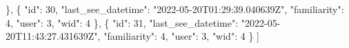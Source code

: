 \documentclass[
]{article}
\newenvironment{Shaded}{}{}
\newcommand{\DataTypeTok}[1]{\textcolor[rgb]{0.56,0.13,0.00}{#1}}
\newcommand{\DecValTok}[1]{\textcolor[rgb]{0.25,0.63,0.44}{#1}}
\newcommand{\FunctionTok}[1]{\textcolor[rgb]{0.02,0.16,0.49}{#1}}
\newcommand{\OtherTok}[1]{\textcolor[rgb]{0.00,0.44,0.13}{#1}}
\newcommand{\StringTok}[1]{\textcolor[rgb]{0.25,0.44,0.63}{#1}}
\begin{document}
\begin{Shaded}
\begin{Highlighting}[]
  \FunctionTok{\}}\OtherTok{,}
  \FunctionTok{\{}
    \DataTypeTok{"id"}\FunctionTok{:} \DecValTok{30}\FunctionTok{,}
    \DataTypeTok{"last\_see\_datetime"}\FunctionTok{:} \StringTok{"2022{-}05{-}20T01:29:39.040639Z"}\FunctionTok{,}
    \DataTypeTok{"familiarity"}\FunctionTok{:} \DecValTok{4}\FunctionTok{,}
    \DataTypeTok{"user"}\FunctionTok{:} \DecValTok{3}\FunctionTok{,}
    \DataTypeTok{"wid"}\FunctionTok{:} \DecValTok{4}
  \FunctionTok{\}}\OtherTok{,}
  \FunctionTok{\{}
    \DataTypeTok{"id"}\FunctionTok{:} \DecValTok{31}\FunctionTok{,}
    \DataTypeTok{"last\_see\_datetime"}\FunctionTok{:} \StringTok{"2022{-}05{-}20T11:43:27.431639Z"}\FunctionTok{,}
    \DataTypeTok{"familiarity"}\FunctionTok{:} \DecValTok{4}\FunctionTok{,}
    \DataTypeTok{"user"}\FunctionTok{:} \DecValTok{3}\FunctionTok{,}
    \DataTypeTok{"wid"}\FunctionTok{:} \DecValTok{4}
  \FunctionTok{\}}
\OtherTok{]}
\end{Highlighting}
\end{Shaded}
\end{document}
